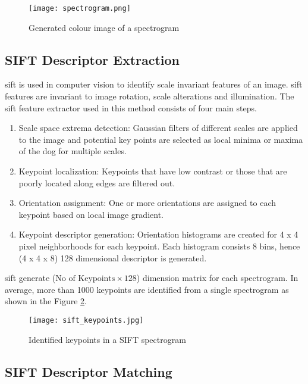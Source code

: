   \begin{figure}[H]
    \centering
    \texttt{[image: spectrogram.png]}
    \caption{Generated colour image of a spectrogram}
    \label{fig:spectrogram_design}
  \end{figure}

\subsection{SIFT Descriptor Extraction}

\ac{sift} is used in computer vision to identify scale invariant features of an image. \ac{sift} features are invariant to image rotation,
scale alterations and illumination\cite{Lowe2004}. The \ac{sift} feature extractor used in this method consists of four main steps.
\begin{enumerate}
  \item Scale space extrema detection: Gaussian filters of different scales are applied to the image and potential key points are selected
  as local minima or maxima of the \ac{dog} for multiple scales.
  \item Keypoint localization: Keypoints that have low contrast or those that are poorly located along edges
  are filtered out.
  \item Orientation assignment: One or more orientations are assigned to each keypoint based on local image gradient. 
  \item Keypoint descriptor generation: Orientation histograms are created for 4 x 4 pixel neighborhoods for each keypoint.
  Each histogram consists 8 bins, hence (4 x 4 x 8) 128 dimensional descriptor is generated.
\end{enumerate}

\ac{sift} generate (\(\text{No of Keypoints} \times 128\)) dimension matrix for each spectrogram. In average, more than 1000 keypoints 
are identified from a single spectrogram as shown in the Figure \ref{fig:spectrogram_keypoints}.  

  \begin{figure}[H]
    \centering
    \texttt{[image: sift\_keypoints.jpg]}
    \caption{Identified keypoints in a SIFT spectrogram}
    \label{fig:spectrogram_keypoints}
  \end{figure}

\subsection{SIFT Descriptor Matching}

